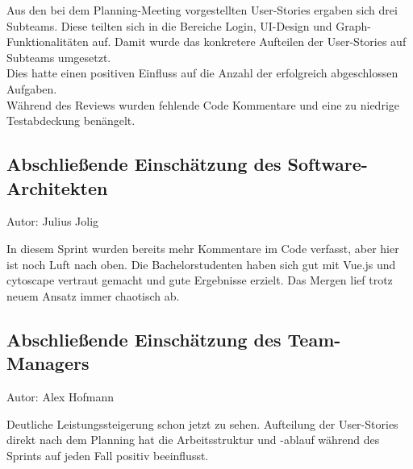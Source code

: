 Aus den bei dem Planning-Meeting vorgestellten User-Stories ergaben sich drei Subteams. Diese teilten sich in die Bereiche Login, UI-Design und Graph-Funktionalitäten auf. Damit wurde das konkretere Aufteilen der User-Stories auf Subteams umgesetzt. \\
Dies hatte einen positiven Einfluss auf die Anzahl der erfolgreich abgeschlossen Aufgaben. \\
Während des Reviews wurden fehlende Code Kommentare und eine zu niedrige Testabdeckung benängelt.


\subsection{Abschließende Einschätzung des Software-Architekten}
{\small Autor: Julius Jolig}

In diesem Sprint wurden bereits mehr Kommentare im Code verfasst, aber hier ist noch Luft nach oben. Die Bachelorstudenten haben sich gut mit Vue.js und cytoscape vertraut gemacht und gute Ergebnisse erzielt. Das Mergen lief trotz neuem Ansatz immer chaotisch ab.  

\subsection{Abschließende Einschätzung des Team-Managers}
{\small Autor: Alex Hofmann}

Deutliche Leistungssteigerung schon jetzt zu sehen. Aufteilung der User-Stories direkt nach dem Planning hat die Arbeitsstruktur und -ablauf während des Sprints auf jeden Fall positiv beeinflusst.

